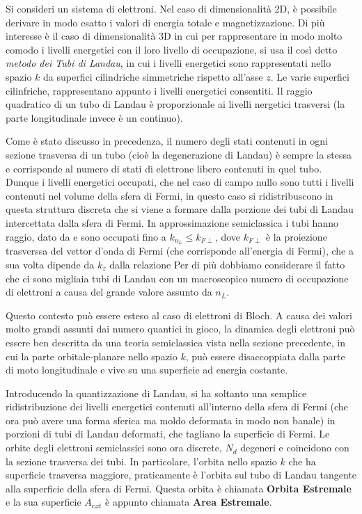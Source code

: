 Si consideri un sistema di elettroni. Nel caso di dimensionalit\`a 2D, \`e possibile derivare in modo esatto i valori di energia totale e magnetizzazione. Di pi\`u interesse \`e il caso di dimensionalit\`a 3D in cui per rappresentare in modo molto comodo i livelli energetici con il loro livello di occupazione, si usa il cos\`i detto \textit{metodo dei Tubi di Landau}, in cui i livelli energetici sono rappresentati nello spazio $k$ da superfici cilindriche simmetriche rispetto all'asse $z$. Le varie superfici cilinfriche, rappresentano appunto i livelli energetici consentiti. Il raggio quadratico di un tubo di Landau \`e proporzionale ai livelli nergetici trasversi (la parte longitudinale invece \`e un continuo).

Come \`e stato discusso in precedenza, il numero degli stati contenuti in ogni sezione trasversa di un tubo (cio\`e la degenerazione di Landau) \`e sempre la stessa e corrisponde al numero di stati di elettrone libero contenuti in quel tubo. Dunque i livelli energetici occupati, che nel caso di campo nullo sono tutti i livelli contenuti nel volume della sfera di Fermi, in questo caso si ridistribuscono in questa struttura discreta che si viene a formare dalla porzione dei tubi di Landau intercettata dalla sfera di Fermi. In approssimazione semiclassica i tubi hanno raggio, dato da
e sono occupati fino a $k_{n_L} \leq k_{F\perp}$, dove $k_{F\perp}$ \`e la proiezione trasverssa del vettor d'onda di Fermi (che corrisponde all'energia di Fermi), che a sua volta dipende da $k_z$ dalla relazione
Per di pi\`u dobbiamo considerare il fatto che ci sono migliaia tubi di Landau con un macroscopico numero di occupazione di elettroni a causa del grande valore assunto da $n_L$.

Questo contesto pu\`o essere esteso al caso di elettroni di Bloch. A causa dei valori molto grandi assunti dai numero quantici in gioco, la dinamica degli elettroni pu\`o essere ben descritta da una teoria semiclassica vista nella sezione precedente, in cui la parte orbitale-planare nello spazio $k$, pu\`o essere disaccoppiata dalla parte di moto longitudinale e vive su una superficie ad energia costante.

Introducendo la quantizzazione di Landau, si ha soltanto una semplice ridistribuzione dei livelli energetici contenuti all'interno della sfera di Fermi (che ora pu\`o avere una forma sferica ma moldo deformata in modo non banale) in porzioni di tubi di Landau deformati, che tagliano la superficie di Fermi. Le orbite degli elettroni semiclassici sono ora discrete, $N_d$ degeneri e coincidono con la sezione trasversa dei tubi. In particolare, l'orbita nello spazio $k$ che ha superficie trasversa maggiore, praticamente \`e l'orbita sul tubo di Landau tangente alla superficie della sfera di Fermi. Questa orbita \`e chiamata \textbf{Orbita Estremale} e la sua superficie $A_{ext}$ \`e appunto chiamata \textbf{Area Estremale}.


